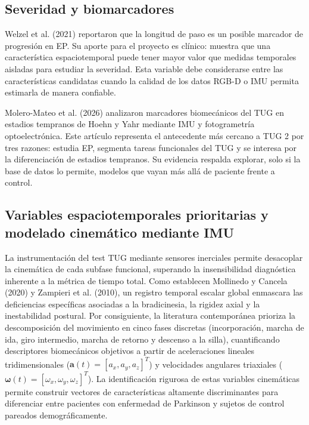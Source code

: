 \documentclass[12pt,a4paper]{article}
\begin{document}
\subsection{Severidad y biomarcadores}\label{sec:ea-severidad}

Welzel et al. (2021) reportaron que la longitud de paso es un posible marcador de progresión en EP. Su aporte para el proyecto es clínico: muestra que una característica espaciotemporal puede tener mayor valor que medidas temporales aisladas para estudiar la severidad. Esta variable debe considerarse entre las características candidatas cuando la calidad de los datos RGB-D o IMU permita estimarla de manera confiable.

Molero-Mateo et al. (2026) analizaron marcadores biomecánicos del TUG en estadios tempranos de Hoehn y Yahr mediante IMU y fotogrametría optoelectrónica. Este artículo representa el antecedente más cercano a TUG 2 por tres razones: estudia EP, segmenta tareas funcionales del TUG y se interesa por la diferenciación de estadios tempranos. Su evidencia respalda explorar, solo si la base de datos lo permite, modelos que vayan más allá de paciente frente a control.

\subsection{Variables espaciotemporales prioritarias y modelado cinemático mediante IMU}\label{sec:ea-variables}

La instrumentación del test TUG mediante sensores inerciales permite desacoplar la cinemática de cada subfase funcional, superando la insensibilidad diagnóstica inherente a la métrica de tiempo total. Como establecen Mollinedo y Cancela (2020) y Zampieri et al. (2010), un registro temporal escalar global enmascara las deficiencias específicas asociadas a la bradicinesia, la rigidez axial y la inestabilidad postural. Por consiguiente, la literatura contemporánea prioriza la descomposición del movimiento en cinco fases discretas (incorporación, marcha de ida, giro intermedio, marcha de retorno y descenso a la silla), cuantificando descriptores biomecánicos objetivos a partir de aceleraciones lineales tridimensionales ($\mathbf{a}(t) = [a_x, a_y, a_z]^T$) y velocidades angulares triaxiales ($\boldsymbol{\omega}(t) = [\omega_x, \omega_y, \omega_z]^T$). La identificación rigurosa de estas variables cinemáticas permite construir vectores de características altamente discriminantes para diferenciar entre pacientes con enfermedad de Parkinson y sujetos de control pareados demográficamente.
\end{document}
